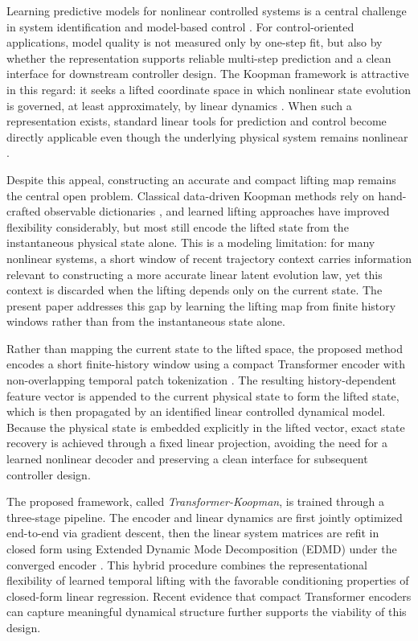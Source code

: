 \documentclass[journal]{IEEEtran}
\begin{document}
Learning predictive models for nonlinear controlled systems is a central challenge in system identification and model-based control \cite{ljung1999system, vanoverschee1994n4sid, nelles2020nonlinear}. For control-oriented applications, model quality is not measured only by one-step fit, but also by whether the representation supports reliable multi-step prediction and a clean interface for downstream controller design. The Koopman framework is attractive in this regard: it seeks a lifted coordinate space in which nonlinear state evolution is governed, at least approximately, by linear dynamics \cite{koopman1931hamiltonian, brunton2022modern}. When such a representation exists, standard linear tools for prediction and control become directly applicable even though the underlying physical system remains nonlinear \cite{otto2021koopman, korda2018linear}.

Despite this appeal, constructing an accurate and compact lifting map remains the central open problem. Classical data-driven Koopman methods rely on hand-crafted observable dictionaries \cite{williams2015data, klus2018data}, and learned lifting approaches \cite{lusch2018deep, takeishi2017koopman} have improved flexibility considerably, but most still encode the lifted state from the instantaneous physical state alone. This is a modeling limitation: for many nonlinear systems, a short window of recent trajectory context carries information relevant to constructing a more accurate linear latent evolution law, yet this context is discarded when the lifting depends only on the current state. The present paper addresses this gap by learning the lifting map from finite history windows rather than from the instantaneous state alone.

Rather than mapping the current state to the lifted space, the proposed method encodes a short finite-history window using a compact Transformer encoder \cite{vaswani2017attention} with non-overlapping temporal patch tokenization \cite{nie2023time}. The resulting history-dependent feature vector is appended to the current physical state to form the lifted state, which is then propagated by an identified linear controlled dynamical model. Because the physical state is embedded explicitly in the lifted vector, exact state recovery is achieved through a fixed linear projection, avoiding the need for a learned nonlinear decoder and preserving a clean interface for subsequent controller design.

The proposed framework, called \emph{Transformer-Koopman}, is trained through a three-stage pipeline. The encoder and linear dynamics are first jointly optimized end-to-end via gradient descent, then the linear system matrices are refit in closed form using Extended Dynamic Mode Decomposition (EDMD) under the converged encoder \cite{williams2015data, proctor2018generalizing}. This hybrid procedure combines the representational flexibility of learned temporal lifting with the favorable conditioning properties of closed-form linear regression. Recent evidence that compact Transformer encoders can capture meaningful dynamical structure \cite{forootani2026compact, forootani2025synthetic} further supports the viability of this design.
\end{document}
